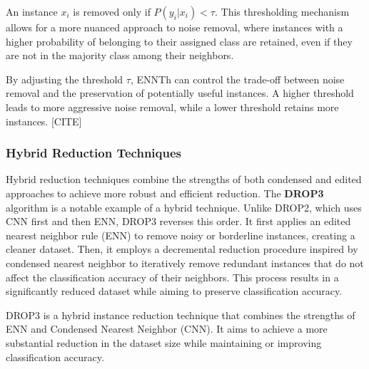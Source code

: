 An instance $x_i$ is removed only if $P(y_i | x_i) < \tau$. This thresholding mechanism allows for a more nuanced approach to noise removal, where instances with a higher probability of belonging to their assigned class are retained, even if they are not in the majority class among their neighbors.

By adjusting the threshold $\tau$, ENNTh can control the trade-off between noise removal and the preservation of potentially useful instances. A higher threshold leads to more aggressive noise removal, while a lower threshold retains more instances. [CITE]



\subsubsection{Hybrid Reduction Techniques}

Hybrid reduction techniques combine the strengths of both condensed and edited approaches to 
achieve more robust and efficient reduction. The \textbf{DROP3} algorithm \cite{wilson2000reduction} 
is a notable example of a hybrid technique. Unlike DROP2, which uses CNN first and then ENN, DROP3 reverses this order. 
It first applies an edited nearest neighbor rule (ENN) to remove noisy or borderline instances, creating a cleaner dataset.
Then, it employs a decremental reduction procedure inspired by condensed nearest neighbor to iteratively remove redundant
instances that do not affect the classification accuracy of their neighbors. This process results in a significantly 
reduced dataset while aiming to preserve classification accuracy.

DROP3 \cite{wilson2000reduction} is a hybrid instance reduction technique that combines the strengths of ENN and Condensed Nearest Neighbor (CNN). It aims to achieve a more substantial reduction in the dataset size while maintaining or improving classification accuracy.\\


